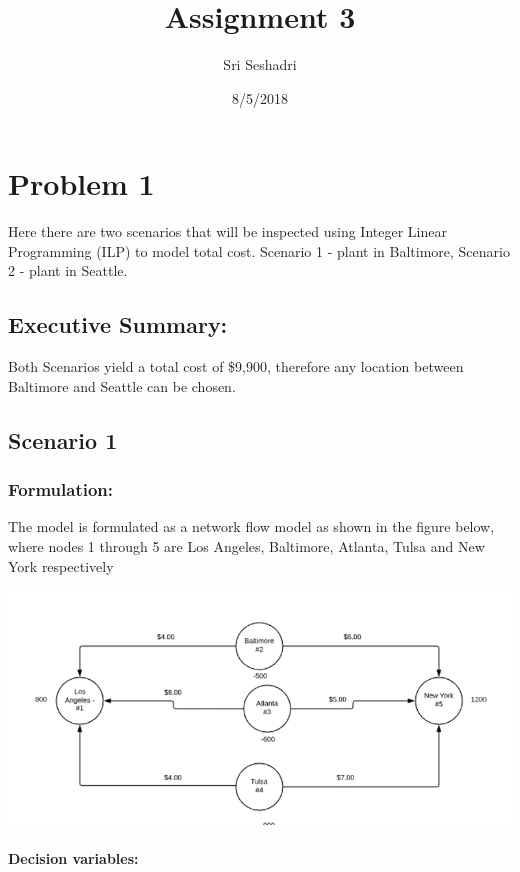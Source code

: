 \documentclass[]{article}
\title{Assignment 3}
\author{Sri Seshadri}
\date{8/5/2018}
\let\oldparagraph\paragraph
\renewcommand{\paragraph}[1]{\oldparagraph{#1}\mbox{}}
\begin{document}
\maketitle

\section{Problem 1}\label{problem-1}

Here there are two scenarios that will be inspected using Integer Linear
Programming (ILP) to model total cost. Scenario 1 - plant in Baltimore,
Scenario 2 - plant in Seattle.

\subsection{Executive Summary:}\label{executive-summary}

Both Scenarios yield a total cost of \$9,900, therefore any location
between Baltimore and Seattle can be chosen.

\subsection{Scenario 1}\label{scenario-1}

\subsubsection{Formulation:}\label{formulation}

The model is formulated as a network flow model as shown in the figure
below, where nodes 1 through 5 are Los Angeles, Baltimore, Atlanta,
Tulsa and New York respectively

\begin{center}\includegraphics[width=10.78in]{Figures/Homework3/1aFig} \end{center}

\paragraph{Decision variables:}\label{decision-variables}
\end{document}
